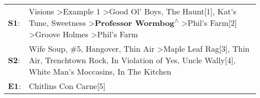 \begin{supertabular}{p{0.03\textwidth}p{0.92\textwidth}}
 \textbf{S1}:  &  Visions\textsuperscript{} \textgreater \enspace Example 1\textsuperscript{} \textgreater \enspace Good Ol' Boys\textsuperscript{}, \enspace The Haunt[1]\textsuperscript{}, \enspace Kat's Tune\textsuperscript{}, \enspace Sweetness\textsuperscript{} \textgreater \enspace \textbf{Professor Wormbog\textsuperscript{$\wedge$}} \textgreater \enspace Phil's Farm[2]\textsuperscript{} \textgreater \enspace Groove Holmes\textsuperscript{} \textgreater \enspace Phil's Farm\textsuperscript{}  \enspace  \\
 \textbf{S2}:  &                             Wife Soup\textsuperscript{}, \enspace \#5\textsuperscript{}, \enspace Hangover\textsuperscript{}, \enspace Thin Air\textsuperscript{} \textgreater \enspace Maple Leaf Rag[3]\textsuperscript{}, \enspace Thin Air\textsuperscript{}, \enspace Trenchtown Rock\textsuperscript{}, \enspace In Violation of Yes\textsuperscript{}, \enspace Uncle Wally[4]\textsuperscript{}, \enspace White Man's Moccasins\textsuperscript{}, \enspace In The Kitchen\textsuperscript{}  \enspace  \\
 \textbf{E1}:  &                                                                                                                                                                                                                                                                                                                                                                                                                                                              Chitlins Con Carne[5]\textsuperscript{}  \enspace  \\
\end{supertabular}

